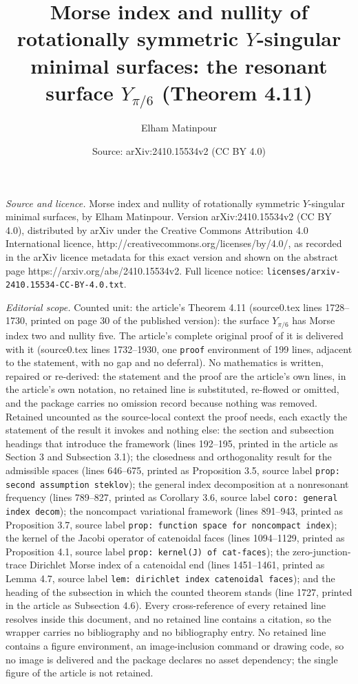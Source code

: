 \documentclass[10pt,a4paper]{amsart}
\title[Theorem 4.11]{Morse index and nullity of rotationally symmetric $Y$-singular minimal surfaces: the resonant surface $Y_{\pi/6}$ (Theorem 4.11)}
\author{Elham Matinpour}
\date{Source: arXiv:2410.15534v2 (CC BY 4.0)}
\begin{document}
\maketitle

\noindent\emph{Source and licence.} Morse index and nullity of rotationally symmetric $Y$-singular minimal surfaces, by Elham Matinpour. Version arXiv:2410.15534v2
(CC BY 4.0), distributed by arXiv under the Creative Commons Attribution 4.0 International licence,
http://creativecommons.org/licenses/by/4.0/, as recorded in the arXiv licence metadata for this exact
version and shown on the abstract page https://arxiv.org/abs/2410.15534v2. Full licence notice:
\texttt{licenses/arxiv-2410.15534-CC-BY-4.0.txt}.\par\smallskip

\noindent\textit{Editorial scope.} Counted unit: the article's Theorem 4.11 (source0.tex lines 1728--1730, printed on page 30 of the published version): the surface $Y_{\pi/6}$ has Morse index two and nullity five. The article's complete original proof of it is delivered with it (source0.tex lines 1732--1930, one \texttt{proof} environment of 199 lines, adjacent to the statement, with no gap and no deferral). No mathematics is written, repaired or re-derived: the statement and the proof are the article's own lines, in the article's own notation, no retained line is substituted, re-flowed or omitted, and the package carries no omission record because nothing was removed. Retained uncounted as the source-local context the proof needs, each exactly the statement of the result it invokes and nothing else: the section and subsection headings that introduce the framework (lines 192--195, printed in the article as Section 3 and Subsection 3.1); the closedness and orthogonality result for the admissible spaces (lines 646--675, printed as Proposition 3.5, source label \texttt{prop: second assumption steklov}); the general index decomposition at a nonresonant frequency (lines 789--827, printed as Corollary 3.6, source label \texttt{coro: general index decom}); the noncompact variational framework (lines 891--943, printed as Proposition 3.7, source label \texttt{prop: function space for noncompact index}); the kernel of the Jacobi operator of catenoidal faces (lines 1094--1129, printed as Proposition 4.1, source label \texttt{prop: kernel(J) of cat-faces}); the zero-junction-trace Dirichlet Morse index of a catenoidal end (lines 1451--1461, printed as Lemma 4.7, source label \texttt{lem: dirichlet index catenoidal faces}); and the heading of the subsection in which the counted theorem stands (line 1727, printed in the article as Subsection 4.6). Every cross-reference of every retained line resolves inside this document, and no retained line contains a citation, so the wrapper carries no bibliography and no bibliography entry. No retained line contains a figure environment, an image-inclusion command or drawing code, so no image is delivered and the package declares no asset dependency; the single figure of the article is not retained.
\end{document}
